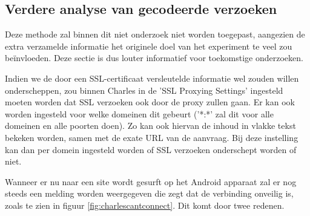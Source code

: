 \subsection{Verdere analyse van gecodeerde verzoeken}
Deze methode zal binnen dit niet onderzoek niet worden toegepast, aangezien de extra verzamelde informatie het originele doel van het experiment te veel zou beïnvloeden. Deze sectie is dus louter informatief voor toekomstige onderzoeken.

Indien we de door een SSL-certificaat versleutelde informatie wel zouden willen onderscheppen, zou binnen Charles in de 'SSL Proxying Settings' ingesteld moeten worden dat SSL verzoeken ook door de proxy zullen gaan. Er kan ook worden ingesteld voor welke domeinen dit gebeurt ('*:*' zal dit voor alle domeinen en alle poorten doen). Zo kan ook hiervan de inhoud in vlakke tekst bekeken worden, samen met de exate URL van de aanvraag. Bij deze instelling kan dan per domein ingesteld worden of SSL verzoeken onderschept worden of niet.

Wanneer er nu naar een site wordt gesurft op het Android apparaat zal er nog steeds een melding worden weergegeven die zegt dat de verbinding onveilig is, zoals te zien in figuur \ref{fig:charlescantconnect}. Dit komt door twee redenen.

